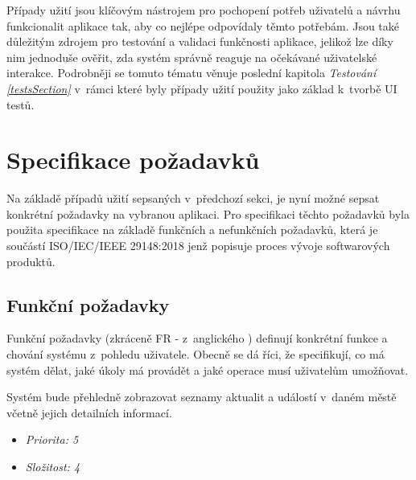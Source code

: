 \bigskip

Případy užití jsou klíčovým nástrojem pro pochopení potřeb uživatelů a návrhu funkcionalit aplikace tak, aby co nejlépe odpovídaly těmto potřebám. 
Jsou také důležitým zdrojem pro testování a validaci funkčnosti aplikace, jelikož lze díky nim jednoduše ověřit, zda systém správně reaguje na očekávané 
uživatelské interakce. Podrobněji se tomuto tématu věnuje poslední kapitola \textit{Testování \ref{testsSection}} v~rámci které byly případy užití
použity jako základ k~tvorbě UI testů.



\section{Specifikace požadavků}
Na základě případů užití sepsaných v~předchozí sekci, je nyní možné sepsat konkrétní požadavky na vybranou aplikaci.
Pro specifikaci těchto požadavků byla použita specifikace na základě funkčních a nefunkčních požadavků, která je součástí ISO/IEC/IEEE 29148:2018
jenž popisuje proces vývoje softwarových produktů.

\subsection{Funkční požadavky}
Funkční požadavky (zkráceně FR - z~anglického ) definují konkrétní funkce a chování systému z~pohledu uživatele. Obecně se dá říci, že specifikují,
co má systém dělat, jaké úkoly má provádět a jaké operace musí uživatelům umožňovat. 


Systém bude přehledně zobrazovat seznamy aktualit a událostí v~daném městě včetně jejich detailních informací.

\begin{itemize}
  \item \textit{Priorita: 5}
  \item \textit{Složitost: 4}
\end{itemize}


